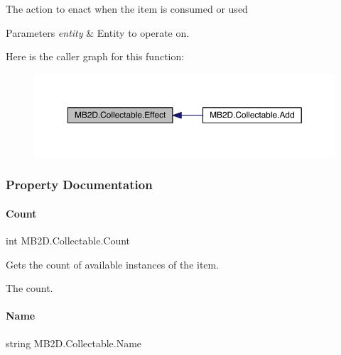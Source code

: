 The action to enact when the item is consumed or used 


\begin{DoxyParams}{Parameters}
{\em entity} & Entity to operate on.\\
\hline
\end{DoxyParams}
Here is the caller graph for this function\+:
\nopagebreak
\begin{figure}[H]
\begin{center}
\leavevmode
\includegraphics[width=350pt]{class_m_b2_d_1_1_collectable_aeb2c8847eb3d5937b015f298703fd753_icgraph}
\end{center}
\end{figure}


\subsubsection{Property Documentation}
\hypertarget{class_m_b2_d_1_1_collectable_a775364ada5d2f8095ca601657da20fc1}{}\label{class_m_b2_d_1_1_collectable_a775364ada5d2f8095ca601657da20fc1} 
\paragraph{\texorpdfstring{Count}{Count}}
{\footnotesize\ttfamily int M\+B2\+D.\+Collectable.\+Count\hspace{0.3cm}{\ttfamily [get]}}



Gets the count of available instances of the item. 

The count.\hypertarget{class_m_b2_d_1_1_collectable_a80d6ce8bb84f84a86ffbd58ad6237e9a}{}\label{class_m_b2_d_1_1_collectable_a80d6ce8bb84f84a86ffbd58ad6237e9a} 
\paragraph{\texorpdfstring{Name}{Name}}
{\footnotesize\ttfamily string M\+B2\+D.\+Collectable.\+Name\hspace{0.3cm}{\ttfamily [get]}}



